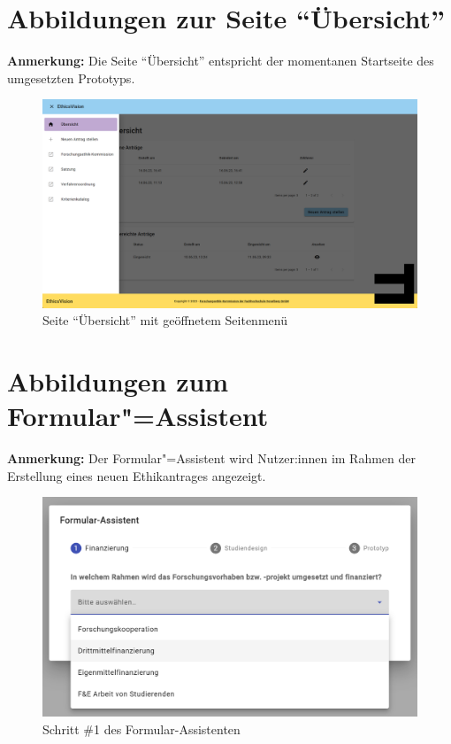 \documentclass[a4paper,12pt,twoside]{scrreprt}
\begin{document}
\clearpage

\section{Abbildungen zur Seite \enquote{Übersicht}}

\textbf{Anmerkung:} Die Seite \enquote{Übersicht} entspricht der momentanen Startseite des umgesetzten Prototyps.

\begin{figure}[ht]
    \centering
    \includegraphics[width=\linewidth]{thesis/images/Luidold_EthicsVision-Übersicht_Menü.png}
    \caption{Seite \enquote{Übersicht} mit geöffnetem Seitenmenü}
    \label{fig:ethics-vision-übersicht-menü}
\end{figure}

\section{Abbildungen zum Formular"=Assistent}
\label{appendix:ethics-vision-formular-assistent}

\textbf{Anmerkung:} Der Formular"=Assistent wird Nutzer:innen im Rahmen der Erstellung eines neuen Ethikantrages angezeigt.

\begin{figure}[ht]
    \centering
    \includegraphics[width=.85\linewidth]{thesis/images/Luidold_EthicsVision-Formular-Assistent_Finanzierung.png}
    \caption{Schritt \#1 des Formular-Assistenten}
    \label{fig:ethics-vision-formular-assistent-finanzierung}
\end{figure}
\end{document}
